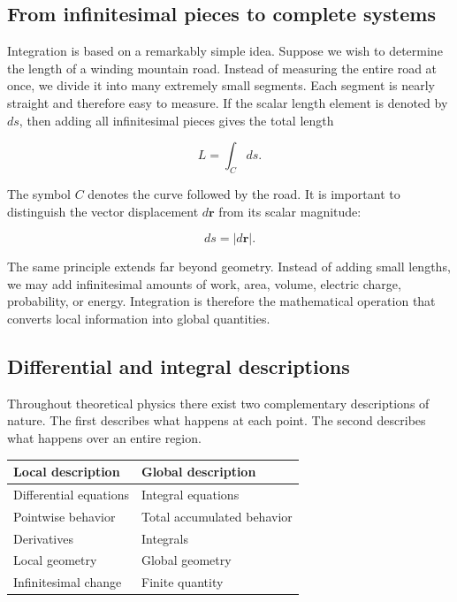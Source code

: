 \subsection{From infinitesimal pieces to complete systems}

Integration is based on a remarkably simple idea. Suppose we wish to determine
the length of a winding mountain road. Instead of measuring the entire road at
once, we divide it into many extremely small segments. Each segment is nearly
straight and therefore easy to measure. If the scalar length element is denoted
by $ds$, then adding all infinitesimal pieces gives the total length

\begin{equation}
  \boxed{L=\int_C ds.}
\end{equation}

The symbol $C$ denotes the curve followed by the road. It is important to
distinguish the vector displacement $d\mathbf r$ from its scalar magnitude:

\begin{equation}
  ds=\lvert d\mathbf r\rvert.
\end{equation}

The same principle extends far beyond geometry. Instead of adding small
lengths, we may add infinitesimal amounts of work, area, volume, electric
charge, probability, or energy. Integration is therefore the mathematical
operation that converts local information into global quantities.

\subsection{Differential and integral descriptions}

Throughout theoretical physics there exist two complementary descriptions of
nature. The first describes what happens at each point. The second describes
what happens over an entire region.

\begin{center}
\begin{tabular}{ll}
\toprule
\textbf{Local description} & \textbf{Global description} \\
\midrule
Differential equations & Integral equations \\
Pointwise behavior & Total accumulated behavior \\
Derivatives & Integrals \\
Local geometry & Global geometry \\
Infinitesimal change & Finite quantity \\
\bottomrule
\end{tabular}
\end{center}

